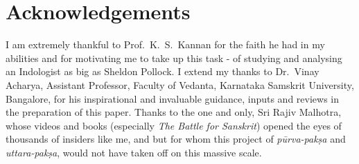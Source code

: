 \section*{Acknowledgements}

I am extremely thankful to Prof.~K.~S.~Kannan for the faith he had in my abilities and for motivating me to take up this task - of studying and analysing an Indologist as big as Sheldon Pollock. I extend my thanks to Dr.~Vinay Acharya, Assistant Professor, Faculty of Vedanta, Karnataka Samskrit University, Bangalore, for his inspirational and invaluable guidance, inputs and reviews in the preparation of this paper. Thanks to the one and only, Sri Rajiv Malhotra, whose videos and books (especially \textsl{The Battle for Sanskrit}) opened the eyes of thousands of insiders like me, and but for whom this project of {\it pūrva-pakṣa} and {\it uttara-pakṣa}, would not have taken off on this massive scale.

